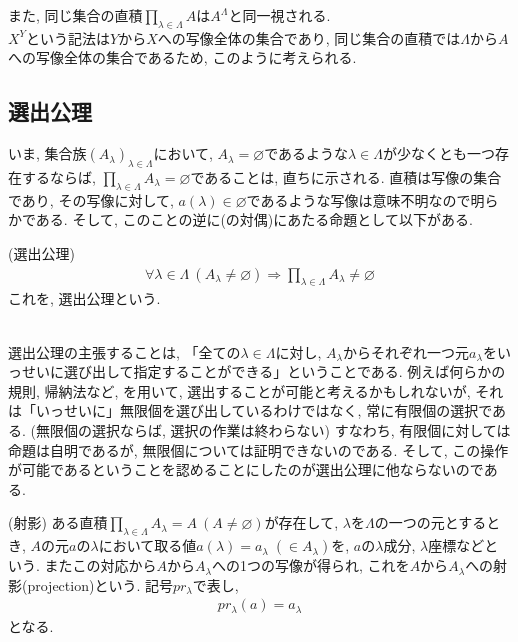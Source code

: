 \documentclass[a4j]{jsarticle}
\begin{document}
 また, 同じ集合の直積$\prod_{\lambda \in \Lambda}A$は$A^\Lambda$と同一視される. \\
$X^Y$という記法は$Y$から$X$への写像全体の集合であり, 同じ集合の直積では$\Lambda$から$A$への写像全体の集合であるため, このように考えられる.

\subsection{選出公理}

いま, 集合族$(A_\lambda)_{\lambda \in \Lambda}$において, $A_\lambda = \varnothing$であるような$\lambda \in \Lambda$が少なくとも一つ存在するならば, $\prod_{\lambda \in \Lambda}A_\lambda = \varnothing$であることは, 直ちに示される. 直積は写像の集合であり, その写像に対して, $a(\lambda) \in \varnothing$であるような写像は意味不明なので明らかである. そして, このことの逆に(の対偶)にあたる命題として以下がある. \\

\begin{itembox}[l]{ (選出公理)}
  \begin{align}
    \label{ac}
    \forall \lambda \in \Lambda\:(A_\lambda \neq \varnothing) \Rightarrow \prod_{\lambda \in \Lambda}A_\lambda \neq \varnothing \tag{AC}
  \end{align}
  これを, 選出公理という.
\end{itembox}\\

 選出公理の主張することは, 「全ての$\lambda \in \Lambda$に対し, $A_\lambda$からそれぞれ一つ元$a_\lambda$をいっせいに選び出して指定することができる」ということである. 例えば何らかの規則, 帰納法など, を用いて, 選出することが可能と考えるかもしれないが, それは「いっせいに」無限個を選び出しているわけではなく, 常に有限個の選択である. (無限個の選択ならば, 選択の作業は終わらない) すなわち, 有限個に対しては命題は自明であるが, 無限個については証明できないのである. そして, この操作が可能であるということを認めることにしたのが選出公理に他ならないのである.

\begin{itembox}[l]{ (射影)}
  ある直積$\prod_{\lambda \in \Lambda}A_\lambda = A\:(A \neq \varnothing)$が存在して, $\lambda$を$\Lambda$の一つの元とするとき, $A$の元$a$の$\lambda$において取る値$a(\lambda)=a_\lambda\;(\in A_\lambda)$を, $a$の$\lambda$成分, $\lambda$座標などという. またこの対応から$A$から$A_\lambda$への1つの写像が得られ, これを$A$から$A_\lambda$への射影(projection)という. 記号$pr_\lambda$で表し,
  \begin{align}
    pr_\lambda(a) = a_\lambda
  \end{align}
  となる.
\end{itembox}
\end{document}
